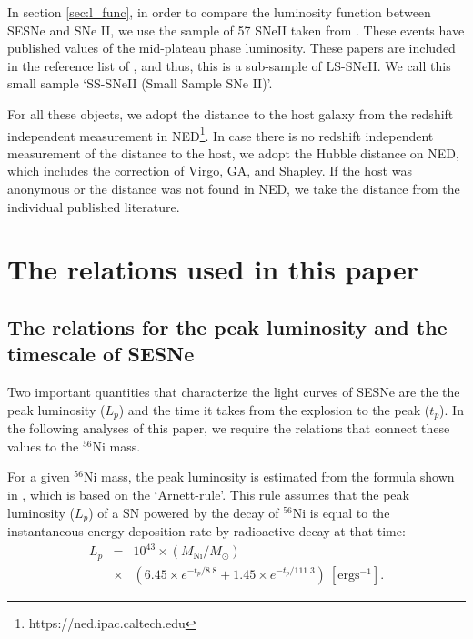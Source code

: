 \documentclass[twocolumn, linenumbers]{aastex62}
\begin{document}
In section \ref{sec:l_func}, in order to compare the luminosity function between SESNe and SNe II, we use the sample of 57 SNeII taken from \citet{2003ApJ...582..905H, 2017ApJ...841..127M, 2015ApJ...806..225P}. 
These events have published values of the mid-plateau phase luminosity. These papers are included in the reference list of \citet{2019A&A...628A...7A}, and thus, this is a sub-sample of LS-SNeII. We call this small sample `SS-SNeII (Small Sample SNe II)'.

For all these objects, we adopt the distance to the host galaxy from the redshift independent measurement in NED\footnote{https://ned.ipac.caltech.edu}. In case there is no redshift independent measurement of the distance to the host, we adopt the Hubble distance on NED, which includes the correction of Virgo, GA, and Shapley. If the host was anonymous or the distance was not found in
NED, we take the distance from the individual published literature.

\section{The relations used in this paper} \label{sec:relation}

\subsection{The relations for the peak luminosity and the timescale of SESNe} \label{sec:relation_SESNe}

Two important quantities that characterize the light curves of SESNe are the the peak luminosity ($L_p$) and the time it takes from the explosion to the peak ($t_p$). In the following analyses of this paper, we require the relations that connect these values to the $^{56}$Ni mass.

For a given $^{56}$Ni mass, the peak luminosity is estimated from the formula shown in \citet{2005A&A...431..423S}, which is based on the `Arnett-rule'. This rule assumes that the peak luminosity ($L_p$) of a SN powered by the decay of $^{56}$Ni is equal to the instantaneous energy deposition rate by radioactive decay at that time: 
\begin{eqnarray}
\label{eq:Lpeak}
L_p &=& 10^{43} \times (M_{\mathrm{Ni}}/M_{\odot}) \nonumber \\
&\times& (6.45 \times e^{-t_p/8.8} +1.45 \times e^{-t_p/111.3})\ 
[\mathrm{erg s^{-1}}].
\end{eqnarray}
\end{document}
